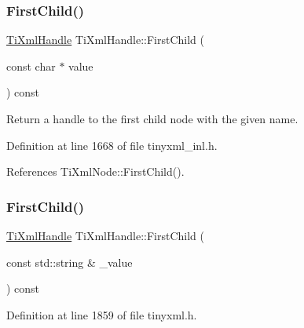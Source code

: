\hypertarget{class_ti_xml_handle_a586ebaca4a4d0909db65a765d95d5e59}{}\label{class_ti_xml_handle_a586ebaca4a4d0909db65a765d95d5e59} 
\subsubsection{\texorpdfstring{First\+Child()}{FirstChild()}\hspace{0.1cm}{\footnotesize\ttfamily [2/3]}}
{\footnotesize\ttfamily \hyperlink{class_ti_xml_handle}{Ti\+Xml\+Handle} Ti\+Xml\+Handle\+::\+First\+Child (\begin{DoxyParamCaption}\item[{const char $\ast$}]{value }\end{DoxyParamCaption}) const}



Return a handle to the first child node with the given name. 



Definition at line 1668 of file tinyxml\+\_\+inl.\+h.



References Ti\+Xml\+Node\+::\+First\+Child().

\hypertarget{class_ti_xml_handle_afd813aae06c0449b04ccf0237076495e}{}\label{class_ti_xml_handle_afd813aae06c0449b04ccf0237076495e} 
\subsubsection{\texorpdfstring{First\+Child()}{FirstChild()}\hspace{0.1cm}{\footnotesize\ttfamily [3/3]}}
{\footnotesize\ttfamily \hyperlink{class_ti_xml_handle}{Ti\+Xml\+Handle} Ti\+Xml\+Handle\+::\+First\+Child (\begin{DoxyParamCaption}\item[{const std\+::string \&}]{\+\_\+value }\end{DoxyParamCaption}) const\hspace{0.3cm}{\ttfamily [inline]}}



Definition at line 1859 of file tinyxml.\+h.

\hypertarget{class_ti_xml_handle_af0643f8683f3f2b779b8c9d78c67b2c0}{}\label{class_ti_xml_handle_af0643f8683f3f2b779b8c9d78c67b2c0} 
